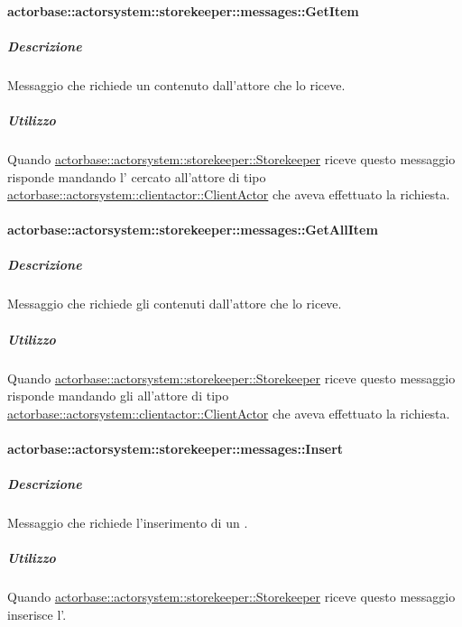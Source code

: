 \documentclass{scalatekids-article}
\begin{document}
\paragraph{actorbase::actorsystem::storekeeper::messages::GetItem}
\label{sec:actorbase::actorsystem::storekeeper::messages::GetItem}

\subparagraph{Descrizione}

Messaggio che richiede un  contenuto dall'attore
 che lo riceve.

\subparagraph{Utilizzo}

Quando \hyperref[sec:actorbase::actorsystem::storekeeper::Storekeeper]{actorbase::actorsystem::storekeeper::Storekeeper}
riceve questo messaggio risponde mandando l' cercato all'attore di tipo
\hyperref[sec:actorbase::actorsystem::clientactor::ClientActor]{actorbase::actorsystem::clientactor::ClientActor}
che aveva effettuato la richiesta.

\paragraph{actorbase::actorsystem::storekeeper::messages::GetAllItem}
\label{sec:actorbase::actorsystem::storekeeper::messages::GetAllItem}

\subparagraph{Descrizione}

Messaggio che richiede gli  contenuti dall'attore
 che lo riceve.

\subparagraph{Utilizzo}

Quando \hyperref[sec:actorbase::actorsystem::storekeeper::Storekeeper]{actorbase::actorsystem::storekeeper::Storekeeper}
riceve questo messaggio risponde mandando gli  all'attore di tipo
\hyperref[sec:actorbase::actorsystem::clientactor::ClientActor]{actorbase::actorsystem::clientactor::ClientActor}
che aveva effettuato la richiesta.

\paragraph{actorbase::actorsystem::storekeeper::messages::Insert}
\label{sec:actorbase::actorsystem::storekeeper::messages::Insert}

\subparagraph{Descrizione}

Messaggio che richiede l'inserimento di un .

\subparagraph{Utilizzo}

Quando \hyperref[sec:actorbase::actorsystem::storekeeper::Storekeeper]{actorbase::actorsystem::storekeeper::Storekeeper}
riceve questo messaggio inserisce l'.
\end{document}
